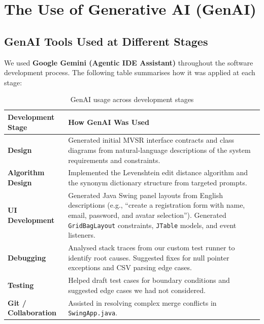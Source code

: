 \documentclass[12pt, a4paper]{article}
\begin{document}
\section{The Use of Generative AI (GenAI)}

\subsection{GenAI Tools Used at Different Stages}
We used \textbf{Google Gemini (Agentic IDE Assistant)} throughout the software development process. The following table summarises how it was applied at each stage:

\begin{table}[H]
\centering
\renewcommand{\arraystretch}{1.3}
\begin{tabular}{|l|p{9cm}|}
\hline
\textbf{Development Stage} & \textbf{How GenAI Was Used} \\ \hline
\textbf{Design} & Generated initial MVSR interface contracts and class diagrams from natural-language descriptions of the system requirements and constraints. \\ \hline
\textbf{Algorithm Design} & Implemented the Levenshtein edit distance algorithm and the synonym dictionary structure from targeted prompts. \\ \hline
\textbf{UI Development} & Generated Java Swing panel layouts from English descriptions (e.g., ``create a registration form with name, email, password, and avatar selection''). Generated \texttt{GridBagLayout} constraints, \texttt{JTable} models, and event listeners. \\ \hline
\textbf{Debugging} & Analysed stack traces from our custom test runner to identify root causes. Suggested fixes for null pointer exceptions and CSV parsing edge cases. \\ \hline
\textbf{Testing} & Helped draft test cases for boundary conditions and suggested edge cases we had not considered. \\ \hline
\textbf{Git / Collaboration} & Assisted in resolving complex merge conflicts in \texttt{SwingApp.java}. \\ \hline
\end{tabular}
\caption{GenAI usage across development stages}
\end{table}
\end{document}

